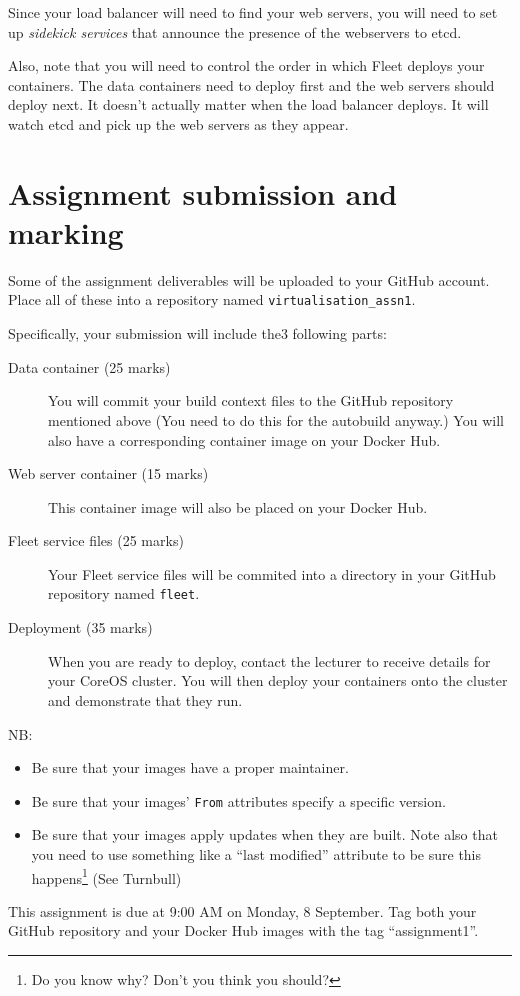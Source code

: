 \documentclass{article}
\begin{document}
Since your load balancer will need to find your web servers, you will need to set up \emph{sidekick services} that announce the presence of the webservers to etcd.

Also, note that you will need to control the order in which Fleet deploys your containers.  The data containers need to deploy first and the web servers should deploy next. It doesn't actually matter when the load balancer deploys.  It will watch etcd and pick up the web servers as they appear.

\section{Assignment submission and marking}
Some of the assignment deliverables will be uploaded to your GitHub account.  Place all of these into a repository named \texttt{virtualisation\_assn1}.

Specifically, your submission will include the3 following parts:

\begin{description}
	\item[Data container (25 marks)] You will commit your build context files to the GitHub repository mentioned above (You need to do this for the autobuild anyway.)  You will also have a corresponding container image on your Docker Hub.
	\item[Web server container (15 marks)] This container image will also be placed on your Docker Hub.
	\item[Fleet service files (25 marks)] Your Fleet service files will be commited into a directory in your GitHub repository named \texttt{fleet}.
	\item[Deployment (35 marks)] When you are ready to deploy, contact the lecturer to receive details for your CoreOS cluster. You will then deploy your containers onto the cluster and demonstrate that they run. 
\end{description}

NB:
\begin{itemize}
	\item Be sure that your images have a proper maintainer.
	\item Be sure that your images' \texttt{From} attributes specify a specific version.
	\item Be sure that your images apply updates when they are built.  Note also that you need to use something like a ``last modified'' attribute to be sure this happens\footnote{Do you know why? Don't you think you should?} (See Turnbull)
\end{itemize}

This assignment is due at 9:00 AM on Monday, 8 September.  Tag both your GitHub repository and your Docker Hub images with the tag ``assignment1''.
\end{document}
